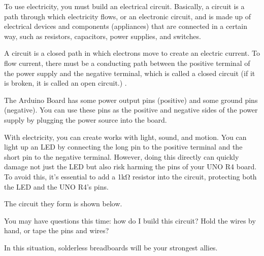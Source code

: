 \documentclass[a4paper,11pt,english]{sphinxmanual}
\let\sphinxpxdimen\pdfpxdimen\else\newdimen\sphinxpxdimen
\begin{document}
\sphinxAtStartPar
To use electricity, you must build an electrical circuit. Basically, a circuit is a path through which electricity flows, or an electronic circuit, and is made up of electrical devices and components (appliances) that are connected in a certain way, such as resistors, capacitors, power supplies, and switches.

\noindent{\hspace*{\fill}\sphinxincludegraphics[width=250\sphinxpxdimen]{{Bulid_Circuit1}.png}\hspace*{\fill}}



\sphinxAtStartPar
A circuit is a closed path in which electrons move to create an electric current. To flow current, there must be a conducting path between the positive terminal of the power supply and the negative terminal, which is called a closed circuit (if it is broken, it is called an open circuit.) .

\sphinxAtStartPar
The Arduino Board has some power output pins (positive) and some ground pins (negative).
You can use these pins as the positive and negative sides of the power supply by plugging the power source into the board.


\sphinxAtStartPar
With electricity, you can create works with light, sound, and motion.
You can light up an LED by connecting the long pin to the positive terminal and the short pin to the negative terminal.
However, doing this directly can quickly damage not just the LED but also risk harming the pins of your UNO R4 board. To avoid this, it’s essential to add a 1kΩ resistor into the circuit, protecting both the LED and the UNO R4’s pins.

\sphinxAtStartPar
The circuit they form is shown below.




\sphinxAtStartPar
You may have questions this time: how do I build this circuit? Hold the wires by hand, or tape the pins and wires?

\sphinxAtStartPar
In this situation, solderless breadboards will be your strongest allies.
\end{document}
